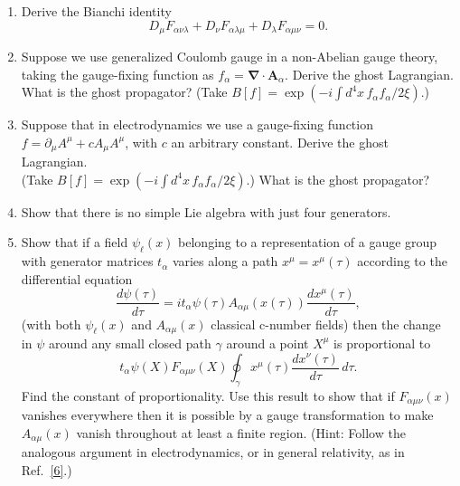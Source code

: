 

\begin{enumerate}
  \item Derive the Bianchi identity
  \[
    D_\mu F_{\alpha\nu\lambda}+D_\nu F_{\alpha\lambda\mu}
    +D_\lambda F_{\alpha\mu\nu}=0.
  \]

  \item Suppose we use generalized Coulomb gauge in a non-Abelian gauge theory, taking the gauge-fixing function as $f_\alpha=\boldsymbol\nabla\cdot\mathbf A_\alpha$. Derive the ghost Lagrangian. What is the ghost propagator? (Take $B[f]=\exp(-i\int d^4x\,f_\alpha f_\alpha/2\xi)$.)

  \item Suppose that in electrodynamics we use a gauge-fixing function $f=\partial_\mu A^\mu+cA_\mu A^\mu$, with $c$ an arbitrary constant. Derive the ghost Lagrangian.\\
  (Take $B[f]=\exp(-i\int d^4x\,f_\alpha f_\alpha/2\xi)$.) What is the ghost propagator?

  \item Show that there is no simple Lie algebra with just four generators.

  \item Show that if a field $\psi_\ell(x)$ belonging to a representation of a gauge group with generator matrices $t_\alpha$ varies along a path $x^\mu=x^\mu(\tau)$ according to the differential equation
  \[
    \frac{d\psi(\tau)}{d\tau}
    =it_\alpha\psi(\tau)A_{\alpha\mu}(x(\tau))\frac{dx^\mu(\tau)}{d\tau},
  \]
  (with both $\psi_\ell(x)$ and $A_{\alpha\mu}(x)$ classical c-number fields) then the change in $\psi$ around any small closed path $\gamma$ around a point $X^\mu$ is proportional to
  \[
    t_\alpha\psi(X)F_{\alpha\mu\nu}(X)
    \oint_\gamma x^\mu(\tau)\frac{dx^\nu(\tau)}{d\tau}\,d\tau.
  \]
  Find the constant of proportionality. Use this result to show that if $F_{\alpha\mu\nu}(x)$ vanishes everywhere then it is possible by a gauge transformation to make $A_{\alpha\mu}(x)$ vanish throughout at least a finite region. (Hint: Follow the analogous argument in electrodynamics, or in general relativity, as in Ref.~\hyperref[ch15-ref-6]{[6]}.)


\end{enumerate}
